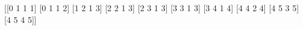 \documentclass[preview]{standalone}
\begin{document}
\begin{center}
[[0 1 1 1]
 [0 1 1 2]
 [1 2 1 3]
 [2 2 1 3]
 [2 3 1 3]
 [3 3 1 3]
 [3 4 1 4]
 [4 4 2 4]
 [4 5 3 5]
 [4 5 4 5]]
\end{center}
\end{document}
